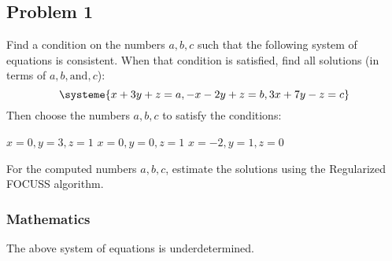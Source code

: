 \subsection{Problem 1}%
\label{sec:problem_1}
Find a condition on the numbers $a, b, c$ such that the following system of equations is
consistent. When that condition is satisfied, find all solutions
(in terms of $a, b, \text{and}, c$):
\begin{equation*}
  \systeme{x+3y+z=a,
  -x-2y+z=b,
  3x+7y-z=c}
\end{equation*}
Then choose the numbers $a, b, c$ to satisfy the conditions:
\begin{tasks}
  \task $x=0, y=3, z=1$
  \task $x=0, y=0, z=1$
  \task $x=-2, y=1, z=0$
\end{tasks}
For the computed numbers $a, b, c$, estimate the solutions using the Regularized FOCUSS
algorithm.
\subsubsection*{Mathematics}
The above system of equations is underdetermined.
